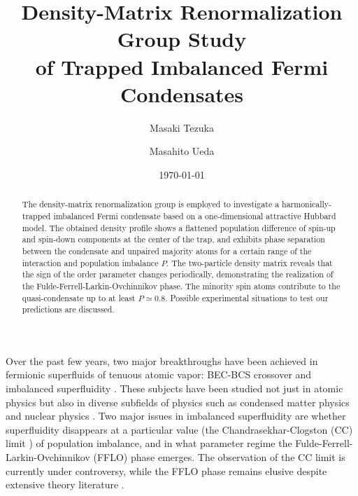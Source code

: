 \documentclass[prl,twocolumn,superscriptaddress,showpacs,preprintnumbers,amsmath,amssymb]{revtex4}
\begin{document}
\title{Density-Matrix Renormalization Group Study \\ 
of Trapped Imbalanced Fermi Condensates}
\author{Masaki Tezuka}
\author{Masahito Ueda}
\date{\today}

\begin{abstract}
The density-matrix renormalization group is employed to investigate a harmonically-trapped
imbalanced Fermi condensate based on a one-dimensional attractive Hubbard model.
The obtained density profile shows a flattened population difference of spin-up and spin-down
components at the center of the trap,
and exhibits phase separation between the condensate and unpaired majority atoms
for a certain range of the interaction and population imbalance $P$.
The two-particle density matrix reveals that the sign of the order parameter changes
periodically, demonstrating the realization of
the Fulde-Ferrell-Larkin-Ovchinnikov phase.
The minority spin atoms contribute to the quasi-condensate up to at least $P \simeq 0.8$.
Possible experimental situations to test our predictions are discussed.
\end{abstract}

\maketitle

Over the past few years, two major breakthroughs have been achieved in fermionic superfluids of
tenuous atomic vapor:
BEC-BCS crossover \cite{2004PhRvL..92d0403R,2005PhRvL..95b0404P}
and imbalanced superfluidity \cite{2006Sci...311..492Z,2006Sci...311..503P}.
These subjects have been studied not just in atomic physics but also in diverse subfields of physics \cite{2004RvMP...76..263C} such as
condensed matter physics
\cite{2000JPCM...12L.471M,
PhysRevB.63.140511,
2002PhRvB..66m4503T,
2004EL.....66..833M}
and nuclear physics \cite{2001PhRvD..63g4016A,2005PhLB..611..137G,2005PhLB..627...89C}.  
Two major issues in imbalanced superfluidity are 
whether superfluidity disappears
at a particular value (the Chandrasekhar-Clogston (CC) limit \cite{CClimit}) of population imbalance, 
and in what parameter regime the Fulde-Ferrell-Larkin-Ovchinnikov (FFLO) phase \cite{PhysRev.135.A550,larkin1964iss} emerges.
The observation of the CC limit is currently under controversy, while the FFLO phase remains elusive \cite{NoteFFLO}
despite extensive theory literature \cite{
2001EL.....55..150C, %
MachidaMizushimaIchioka, %
2005PhRvA..72b5601C,%
2006PhRvL..96f0401S,%
2006PhRvL..96k0403K,%
2006PhRvL..97u0402G,%
LiuHuDrummond,%
2007PhRvA..75f3601Y, %
2007PhRvL..98g0402O, %
2007PhRvL..98q0402V}. %
\end{document}
